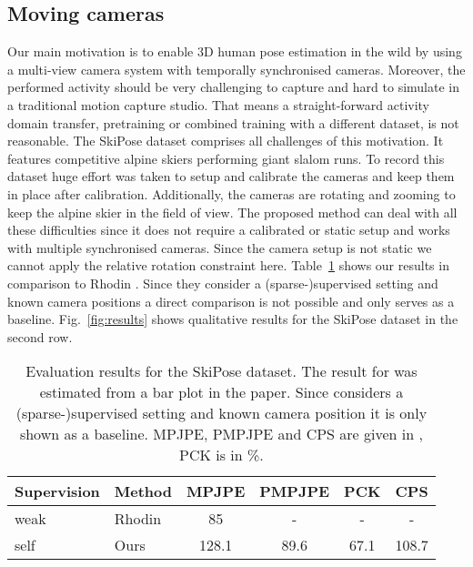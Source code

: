 \documentclass[final]{cvpr}
\begin{document}
\subsection{Moving cameras}
Our main motivation is to enable 3D human pose estimation in the wild by using a multi-view camera system with temporally synchronised cameras.
Moreover, the performed activity should be very challenging to capture and hard to simulate in a traditional motion capture studio.
That means a straight-forward activity domain transfer, \eg pretraining or combined training with a different dataset, is not reasonable. 
The SkiPose dataset \cite{sporri2016reasearch_skipose,rhodin2018learning} comprises all challenges of this motivation.
It features competitive alpine skiers performing giant slalom runs.
To record this dataset huge effort was taken to setup and calibrate the cameras and keep them in place after calibration.
Additionally, the cameras are rotating and zooming to keep the alpine skier in the field of view.
The proposed method can deal with all these difficulties since it does not require a calibrated or static setup and works with multiple synchronised cameras.
Since the camera setup is not static we cannot apply the relative rotation constraint here.
Table~\ref{tab:eval_skipose} shows our results in comparison to Rhodin \etal \cite{rhodin2018learning}.
Since they consider a (sparse-)supervised setting and known camera positions a direct comparison is not possible and only serves as a baseline.
Fig.~\ref{fig:results} shows qualitative results for the SkiPose dataset in the second row.

\begin{table}[h!tp]
	\footnotesize
    \caption{Evaluation results for the SkiPose dataset. The result for \cite{rhodin2018learning} was estimated from a bar plot in the paper. Since \cite{rhodin2018learning} considers a (sparse-)supervised setting and known camera position it is only shown as a baseline. MPJPE, PMPJPE and CPS are given in , PCK is in \%.}
	\centering
	\setlength\tabcolsep{4pt}
    \begin{tabular}{ l | l | c c c c }
        Supervision & Method                        & MPJPE     & PMPJPE    & PCK   & CPS\\
        \hline
        weak &
        Rhodin \cite{rhodin2018learning}                       & 85        & -         & -     & -\\
        \hline
        self &
        Ours                                                        & 128.1     & 89.6      & 67.1  & 108.7\\
    \end{tabular}
    \label{tab:eval_skipose}
\end{table}
\end{document}
